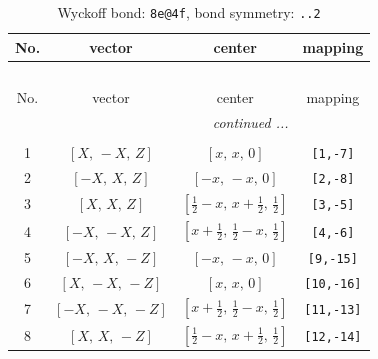 \documentclass[fleqn,8pt]{jsarticle}
\begin{document}
\begin{longtable}{cccc}
\caption{Wyckoff bond: {\tt 8e@4f}, bond symmetry: {\tt ..2}}
 \\
 \hline \hline
No. & vector & center & mapping \\ \hline \endfirsthead

\multicolumn{3}{l}{\tablename\ \thetable{}} \\
 \hline \hline
No. & vector & center & mapping \\ \hline \endhead

 \hline \hline
\multicolumn{3}{r}{\footnotesize\it continued ...} \\ \endfoot

 \hline \hline
\multicolumn{3}{r}{} \\ \endlastfoot

1 & $\left[ X,\, - X,\, Z \right]$ & $\left[ x,\, x,\, 0 \right]$ & {\tt [1,-7]} \\ \hline
2 & $\left[ - X,\, X,\, Z \right]$ & $\left[ - x,\, - x,\, 0 \right]$ & {\tt [2,-8]} \\ \hline
3 & $\left[ X,\, X,\, Z \right]$ & $\left[ \frac{1}{2} - x,\, x + \frac{1}{2},\, \frac{1}{2} \right]$ & {\tt [3,-5]} \\ \hline
4 & $\left[ - X,\, - X,\, Z \right]$ & $\left[ x + \frac{1}{2},\, \frac{1}{2} - x,\, \frac{1}{2} \right]$ & {\tt [4,-6]} \\ \hline
5 & $\left[ - X,\, X,\, - Z \right]$ & $\left[ - x,\, - x,\, 0 \right]$ & {\tt [9,-15]} \\ \hline
6 & $\left[ X,\, - X,\, - Z \right]$ & $\left[ x,\, x,\, 0 \right]$ & {\tt [10,-16]} \\ \hline
7 & $\left[ - X,\, - X,\, - Z \right]$ & $\left[ x + \frac{1}{2},\, \frac{1}{2} - x,\, \frac{1}{2} \right]$ & {\tt [11,-13]} \\ \hline
8 & $\left[ X,\, X,\, - Z \right]$ & $\left[ \frac{1}{2} - x,\, x + \frac{1}{2},\, \frac{1}{2} \right]$ & {\tt [12,-14]} \\
\end{longtable}
\renewcommand{\arraystretch}{1.2}
\end{document}
